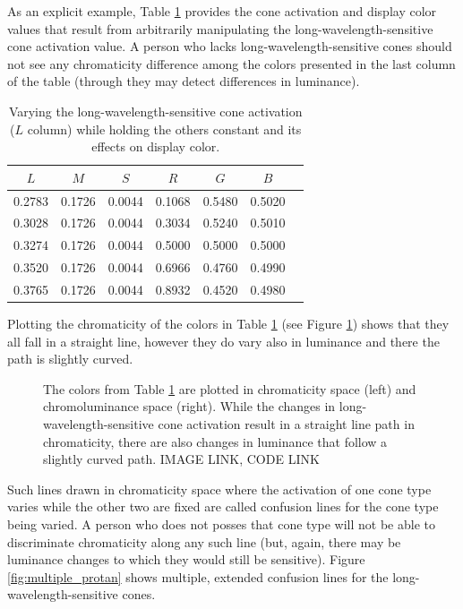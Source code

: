 \documentclass{article}
\newif\ifinvert
\begin{document}
As an explicit example, Table \ref{table:varying_l_cone_activation} provides the cone activation and display color values that result from arbitrarily manipulating the long-wavelength-sensitive cone activation value.  A person who lacks long-wavelength-sensitive cones should not see any chromaticity difference among the colors presented in the last column of the table (through they may detect differences in luminance).

\begin{table} %
    \begin{tabular}{c|c|c|c|c|c|c}
        \hline
        $L$ & $M$ & $S$ & $R$ & $G$ & $B$\\
        \hline
        0.2783 & 0.1726 & 0.0044 & 0.1068 & 0.5480 & 0.5020 & \cellcolor{l1}\\
        0.3028 & 0.1726 & 0.0044 & 0.3034 & 0.5240 & 0.5010 & \cellcolor{l2}\\
        0.3274 & 0.1726 & 0.0044 & 0.5000 & 0.5000 & 0.5000 & \cellcolor{l3}\\
        0.3520 & 0.1726 & 0.0044 & 0.6966 & 0.4760 & 0.4990 & \cellcolor{l4}\\
        0.3765 & 0.1726 & 0.0044 & 0.8932 & 0.4520 & 0.4980 & \cellcolor{l5}
    \end{tabular}
    \caption{Varying the long-wavelength-sensitive cone activation ($L$ column) while holding the others constant and its effects on display color.}\label{table:varying_l_cone_activation}
\end{table}

Plotting the chromaticity of the colors in Table \ref{table:varying_l_cone_activation} (see Figure \ref{fig:single_protan}) shows that they all fall in a straight line, however they do vary also in luminance and there the path is slightly curved.

\begin{figure} %
    \ifinvert
        
    \else
        
    \fi
    \caption{The colors from Table \ref{table:varying_l_cone_activation} are plotted in chromaticity space (left) and chromoluminance space (right).  While the changes in long-wavelength-sensitive cone activation result in a straight line path in chromaticity, there are also changes in luminance that follow a slightly curved path.  IMAGE LINK, CODE LINK}\label{fig:single_protan}
\end{figure}

Such lines drawn in chromaticity space where the activation of one cone type varies while the other two are fixed are called confusion lines for the cone type being varied.  A person who does not posses that cone type will not be able to discriminate chromaticity along any such line (but, again, there may be luminance changes to which they would still be sensitive).  Figure \ref{fig:multiple_protan} shows multiple, extended confusion lines for the long-wavelength-sensitive cones.
\end{document}

